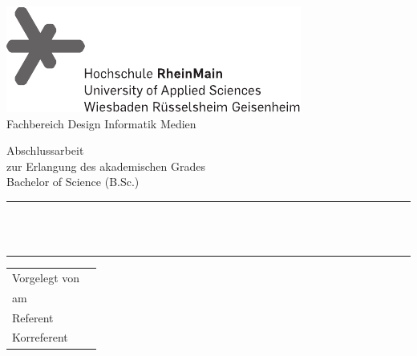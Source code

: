 \begin{titlepage}
	\begin{center}
		\includegraphics{hsrm-logo.pdf} \\[0.7cm]
		{Fachbereich Design Informatik Medien}
		
		\vfill

		{\LARGE Abschlussarbeit} \\[0.5cm]
		{\large zur Erlangung des akademischen Grades} \\[0.5cm]
		{\large Bachelor of Science (B.Sc.)}
		
		\rule{\textwidth}{1pt}\\[0.5cm]
		{\huge \bfseries \thetitle}\\[0.1cm]
		\rule{\textwidth}{1pt}
		
		\vfill
		
		\begin{tabular}{lr}
			Vorgelegt von & \theauthor \\
			am & \thedate \\
			Referent & \thesupervisor \\
			Korreferent & \thecosupervisor
		\end{tabular}
		
		\vfill
		
		
	\end{center}
\end{titlepage}
